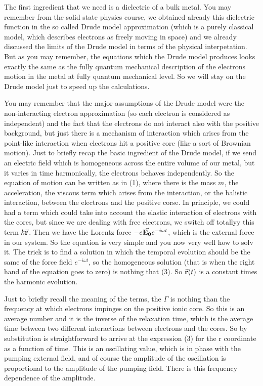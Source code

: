\documentclass[../main/main.tex]{subfiles}
\begin{document}
The first ingredient that we need is a dielectric of a bulk metal. You may remember from the solid state physics course, we obtained already this dielectric function in the so called Drude model approximation (which is a purely classical model, which describes electrons as freely moving in space) and we already discussed the limits of the Drude model in terms of the physical interpetation. But as you may remember, the equations which the Drude model produces looks exactly the same as the fully quantum mechanical description of the electrons motion in the metal at fully quantum mechanical level. So we will stay on the Drude model just to speed up the calculations.

You may remember that the major assumptions of the Drude model were the non-interacting electron approximation (so each electron is considered as independent) and the fact that the electrons do not interact also with the positive background, but just there is a mechanism of interaction which arises from the point-like interaction when electrons hit a positive core (like a sort of Brownian motion). Just to briefly recap the basic ingredient of the Drude model, if we send an electric field which is homogeneous across the entire volume of our metal, but it varies in time harmonically, the electrons behaves independently. So the equation of motion can be written as in (1), where there is the mass \( m \), the acceleration, the viscous term which arises from the interaction, or the balistic interaction, between the electrons and the positive corse. In principle, we could had a term which could take into account the elastic interaction of electrons with the cores, but since we are dealing with free electrons, we switch off totallyy this term \( k \va{r} \). Then we have the Lorentz force \( -e \va{E_0} e^{- i \omega t}  \), which is the external force in our system. So the equation is very simple and you now very well how to solv it. The trick is to find a solution in which the temporal evolution should be the same of the force field \( e^{- i \omega t}  \), so the homogeneous solution (that is when the right hand of the equation goes to zero) is nothing that (3). So \( \va{r } (t) \) is a constant times the harmonic evolution.

Just to briefly recall the meaning of the terms, the \( \Gamma  \) is nothing than the frequency at which electrons impinges on the positive ionic core. So this is an average number and it is the inverse of the relaxation time, which is the average time between two different interactions between electrons and the cores. So by substitution is straightforward to arrive at the expression (3) for the r coordinate as a function of time. This is an oscillating value, which is in phase with the pumping external field, and of course the amplitude of the oscillation is proportional to the amplitude of the pumping field. There is this frequency dependence of the amplitude.
\end{document}
